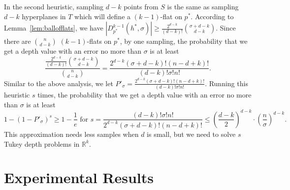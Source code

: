 \documentclass [letterpaper] {article}
\begin{document}
In the second heuristic, sampling $d - k$ points from $S$ is the same as sampling $d - k$ hyperplanes in $T$ which will define a $(k-1)$-flat on $p^{*}$. According to Lemma~\ref{lem:ballofflats}, we have $|D_{p^{*}}^{k-1}(h^{*},\sigma)| \geq \frac{2^{d-k}}{(d-k)!}\binom{\sigma + d-k}{d-k}$. Since there are $\binom{n}{d-k}$ $(k-1)$-flats on $p^{*}$, by one sampling, the probability that we get a depth value with an error no more than $\sigma$ is at least
\begin{equation}
  \label{eq:prbflats}
  \frac{\frac{2^{d-k}}{(d-k)!}\binom{\sigma + d-k}{d-k}}{\binom{n}{d-k}} = \frac{2^{d-k}(\sigma+d-k)!(n-d+k)!}{(d-k)!\sigma!n!}.
\end{equation}
Similar to the above analysis, we let $P'_{\sigma} = \frac{2^{d-k}(\sigma+d-k)!(n-d+k)!}{(d-k)!\sigma!n!}$. Running this heuristic $s$ times, the probability that we get a depth value with an error no more than $\sigma$ is at least
\begin{equation}
  \label{eq:prbappr2}
  1 - (1 - P'_{\sigma})^{s} \geq 1 - \frac{1}{e} \textrm{ for } s = \frac{(d-k)!\sigma!n!}{2^{d-k}(\sigma+d-k)!(n-d+k)!} \leq \left( \frac{d-k}{2} \right)^{d-k} \cdot \left( \frac{n}{\sigma} \right)^{d-k} .
\end{equation}
This approximation needs less samples when $d$ is small, but we need to solve $s$ Tukey depth problems in $\mathbb{R}^{k}$.

\section{Experimental Results}
\label{sec:experi}
\end{document}
